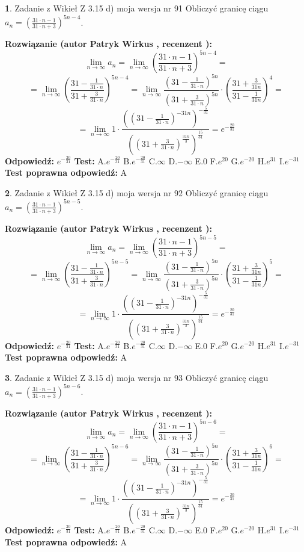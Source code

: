 \documentclass[12pt, a4paper]{article}
\theoremstyle{definition} %
\newtheorem{zad}{}
\newcommand{\zadStart}[1]{\begin{zad}#1\newline}
\newcommand{\zadStop}{\end{zad}}
\newcommand{\rozwStart}[2]{\noindent \textbf{Rozwiązanie (autor #1 , recenzent #2): }\newline}
\newcommand{\rozwStop}{\newline}
\newcommand{\odpStart}{\noindent \textbf{Odpowiedź:}\newline}
\newcommand{\odpStop}{\newline}
\newcommand{\testStart}{\noindent \textbf{Test:}\newline}
\newcommand{\testStop}{\newline}
\newcommand{\kluczStart}{\noindent \textbf{Test poprawna odpowiedź:}\newline}
\newcommand{\kluczStop}{\newline}
\begin{document}
\zadStart{Zadanie z Wikieł Z 3.15 d) moja wersja nr 91}
Obliczyć granicę ciągu $a_{n}=(\frac{31\cdot n - 1}{31 \cdot n + 3})^{5n-4}$.
\zadStop
\rozwStart{Patryk Wirkus}{}
$$\lim\limits_{n\to\infty} a_{n} = \lim\limits_{n\to\infty}(\frac{31\cdot n - 1}{31 \cdot n + 3})^{5n-4}=$$
$$=\lim\limits_{n\to\infty}(\frac{31 - \frac{1}{31\cdot n}}{31 + \frac{3}{31 \cdot n}})^{5n-4}=\lim\limits_{n\to\infty}\frac{(31 - \frac{1}{31\cdot n})^{5n}}{(31 + \frac{3}{31\cdot n})^{5n}} \cdot (\frac{31+\frac{3}{31n}}{31-\frac{1}{31n}})^{4}=$$
$$=\lim\limits_{n\to\infty} 1 \cdot \frac{((31-\frac{1}{31 \cdot n})^{-31n})^{-\frac{5}{31}}}{((31+\frac{3}{31 \cdot n})^{\frac{31n}{3}})^{\frac{15}{31}}} =e^{-\frac{20}{31}}$$
\rozwStop
\odpStart
$e^{-\frac{20}{31}}$
\odpStop
\testStart
A.$ e^{-\frac{20}{31}}$
B.$ e^{-\frac{20}{31}}$
C.$\infty$
D.$-\infty$
E.$0$
F.$e^{20}$
G.$e^{-20}$
H.$e^{31}$
I.$e^{-31}$
\testStop
\kluczStart
A
\kluczStop



\zadStart{Zadanie z Wikieł Z 3.15 d) moja wersja nr 92}
Obliczyć granicę ciągu $a_{n}=(\frac{31\cdot n - 1}{31 \cdot n + 3})^{5n-5}$.
\zadStop
\rozwStart{Patryk Wirkus}{}
$$\lim\limits_{n\to\infty} a_{n} = \lim\limits_{n\to\infty}(\frac{31\cdot n - 1}{31 \cdot n + 3})^{5n-5}=$$
$$=\lim\limits_{n\to\infty}(\frac{31 - \frac{1}{31\cdot n}}{31 + \frac{3}{31 \cdot n}})^{5n-5}=\lim\limits_{n\to\infty}\frac{(31 - \frac{1}{31\cdot n})^{5n}}{(31 + \frac{3}{31\cdot n})^{5n}} \cdot (\frac{31+\frac{3}{31n}}{31-\frac{1}{31n}})^{5}=$$
$$=\lim\limits_{n\to\infty} 1 \cdot \frac{((31-\frac{1}{31 \cdot n})^{-31n})^{-\frac{5}{31}}}{((31+\frac{3}{31 \cdot n})^{\frac{31n}{3}})^{\frac{15}{31}}} =e^{-\frac{20}{31}}$$
\rozwStop
\odpStart
$e^{-\frac{20}{31}}$
\odpStop
\testStart
A.$ e^{-\frac{20}{31}}$
B.$ e^{-\frac{20}{31}}$
C.$\infty$
D.$-\infty$
E.$0$
F.$e^{20}$
G.$e^{-20}$
H.$e^{31}$
I.$e^{-31}$
\testStop
\kluczStart
A
\kluczStop



\zadStart{Zadanie z Wikieł Z 3.15 d) moja wersja nr 93}
Obliczyć granicę ciągu $a_{n}=(\frac{31\cdot n - 1}{31 \cdot n + 3})^{5n-6}$.
\zadStop
\rozwStart{Patryk Wirkus}{}
$$\lim\limits_{n\to\infty} a_{n} = \lim\limits_{n\to\infty}(\frac{31\cdot n - 1}{31 \cdot n + 3})^{5n-6}=$$
$$=\lim\limits_{n\to\infty}(\frac{31 - \frac{1}{31\cdot n}}{31 + \frac{3}{31 \cdot n}})^{5n-6}=\lim\limits_{n\to\infty}\frac{(31 - \frac{1}{31\cdot n})^{5n}}{(31 + \frac{3}{31\cdot n})^{5n}} \cdot (\frac{31+\frac{3}{31n}}{31-\frac{1}{31n}})^{6}=$$
$$=\lim\limits_{n\to\infty} 1 \cdot \frac{((31-\frac{1}{31 \cdot n})^{-31n})^{-\frac{5}{31}}}{((31+\frac{3}{31 \cdot n})^{\frac{31n}{3}})^{\frac{15}{31}}} =e^{-\frac{20}{31}}$$
\rozwStop
\odpStart
$e^{-\frac{20}{31}}$
\odpStop
\testStart
A.$ e^{-\frac{20}{31}}$
B.$ e^{-\frac{20}{31}}$
C.$\infty$
D.$-\infty$
E.$0$
F.$e^{20}$
G.$e^{-20}$
H.$e^{31}$
I.$e^{-31}$
\testStop
\kluczStart
A
\kluczStop
\end{document}

